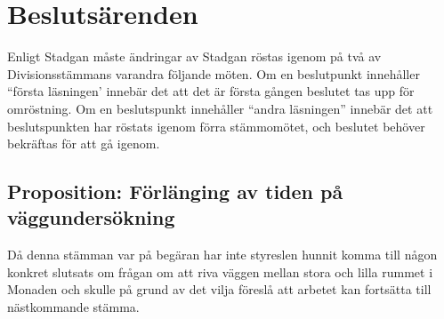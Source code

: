 \documentclass[protokoll]{dvd}
\begin{document}
% 
% 
% 
% 
% 
% 
% 
% 
% 
% 
% 
% 
% 
\section{Beslutsärenden}

Enligt Stadgan måste ändringar av Stadgan röstas igenom på två av Divisionsstämmans varandra följande möten.
Om en beslutpunkt innehåller ``första läsningen' innebär det att det är första gången beslutet tas upp för omröstning.
Om en beslutspunkt innehåller ``andra läsningen'' innebär det att beslutspunkten har röstats igenom förra stämmomötet, och beslutet behöver bekräftas för att gå igenom.

\subsection*{Proposition: Förlänging av tiden på väggundersökning}
Då denna stämman var på begäran har inte styreslen hunnit komma till någon
konkret slutsats om frågan om att riva väggen mellan stora och lilla rummet i
Monaden och skulle på grund av det vilja föreslå att arbetet kan fortsätta
till nästkommande stämma.
\end{document}
